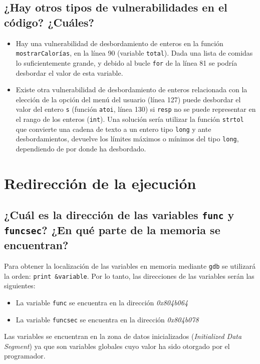 \documentclass[10pt,a4paper]{article}
\begin{document}
\subsection{¿Hay otros tipos de vulnerabilidades en el código? ¿Cuáles?}
\begin{itemize}
\item Hay una vulnerabilidad de desbordamiento de enteros en la función \texttt{mostrarCalorías}, en la línea 90 (variable \texttt{total}). Dada una lista de comidas lo suficientemente grande, y debido al bucle \texttt{for} de la línea 81 se podría desbordar el valor de esta variable.
\item Existe otra vulnerabilidad de desbordamiento de enteros relacionada con la elección de la opción del menú del usuario (línea 127) puede desbordar el valor del entero \texttt{s} (función \texttt{atoi}, línea 130) si \texttt{resp} no se puede representar en el rango de los enteros (\texttt{int}). Una solución sería utilizar la función \texttt{strtol} que convierte una cadena de texto a un entero tipo \texttt{long} y ante desbordamientos, devuelve los límites máximos o mínimos del tipo \texttt{long}, dependiendo de por donde ha desbordado.
\end{itemize}


\section{Redirección de la ejecución}

\subsection{¿Cuál es la dirección de las variables \texttt{func} y \texttt{funcsec}? ¿En qué parte de la memoria se encuentran?}

Para obtener la localización de las variables en memoria mediante \texttt{gdb} se utilizará la orden: \texttt{print \&{}variable}. Por lo tanto, las direcciones de las variables serán las siguientes:
\begin{itemize}
\item La variable \texttt{func} se encuentra en la dirección \emph{0x804b064}
\item La variable \texttt{funcsec} se encuentra en la dirección \emph{0x804b078}
\end{itemize}

Las variables se encuentran en la zona de datos inicializados (\emph{Initialized Data Segment}) ya que son variables globales cuyo valor ha sido otorgado por el programador.
\end{document}
